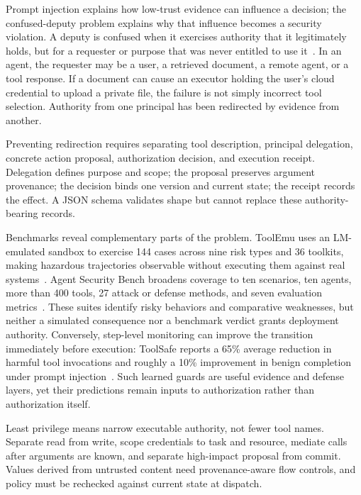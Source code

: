 Prompt injection explains how low-trust evidence can influence a decision; the confused-deputy problem explains why that influence becomes a security violation. A deputy is confused when it exercises authority that it legitimately holds, but for a requester or purpose that was never entitled to use it~\cite{hardy1988confuseddeputy}. In an agent, the requester may be a user, a retrieved document, a remote agent, or a tool response. If a document can cause an executor holding the user's cloud credential to upload a private file, the failure is not simply incorrect tool selection. Authority from one principal has been redirected by evidence from another.

Preventing redirection requires separating tool description, principal delegation, concrete action proposal, authorization decision, and execution receipt. Delegation defines purpose and scope; the proposal preserves argument provenance; the decision binds one version and current state; the receipt records the effect. A JSON schema validates shape but cannot replace these authority-bearing records.

Benchmarks reveal complementary parts of the problem. ToolEmu uses an LM-emulated sandbox to exercise 144 cases across nine risk types and 36 toolkits, making hazardous trajectories observable without executing them against real systems~\cite{ruan2024toolemu}. Agent Security Bench broadens coverage to ten scenarios, ten agents, more than 400 tools, 27 attack or defense methods, and seven evaluation metrics~\cite{zhang2024agentsecuritybench}. These suites identify risky behaviors and comparative weaknesses, but neither a simulated consequence nor a benchmark verdict grants deployment authority. Conversely, step-level monitoring can improve the transition immediately before execution: ToolSafe reports a 65\% average reduction in harmful tool invocations and roughly a 10\% improvement in benign completion under prompt injection~\cite{mou2026toolsafe}. Such learned guards are useful evidence and defense layers, yet their predictions remain inputs to authorization rather than authorization itself.

Least privilege means narrow executable authority, not fewer tool names. Separate read from write, scope credentials to task and resource, mediate calls after arguments are known, and separate high-impact proposal from commit. Values derived from untrusted content need provenance-aware flow controls, and policy must be rechecked against current state at dispatch.

